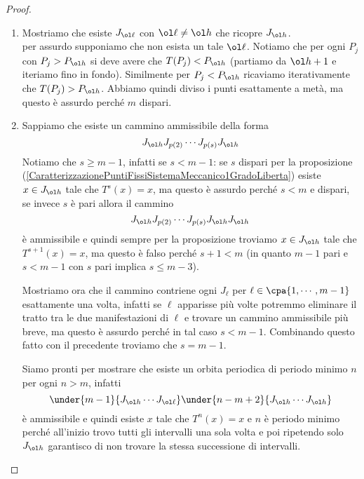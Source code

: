 \begin{proof}
\begin{enumerate}
Sia $\cpa{V_k}$ tale che per ogni $v\in V_{k+1}$ esiste $w\in V_k$ tale che $w\to v$ sta nel $T$-grafo e $V_1=\cpa{\ol h}$.\\
Notiamo che $V_k\subseteq V_{k+1}$ per ogni $k\geq 1$, quindi esiste $\ol k$ tale che $V_{\ol k}=V_{\ol k+1}=V_r$ per ogni $r\geq \ol k+1$. Questa sabilizzazione pu\`o avvenire in due modi: $V_{\ol k}=\cpa{1,\cdots,m-1}$ e abbiamo completato il passo, oppure troviamo un sottoinsieme stretto di $\cpa{1,\cdots, m-1}$, ma questo implica che partendo da $\ol h$ esiste un intervallo che non viene ricoperto (per esempio $J_a$). Sappiamo che gli estremi di $J_a$ per\`o devono essere raggiunti perch\'e sono punti dell'orbita e trattando i vari casi**** questo restituisce un'orbita in $\Oc(P_1)$ di periodo minimo pi\`u piccolo di $m$, assurdo.
\item Mostriamo che esiste $J_{\ol \ell}$ con $\ol \ell\neq \ol h$ che ricopre $J_{\ol h}$.\\
per assurdo supponiamo che non esista un tale $\ol\ell$. Notiamo che per ogni $P_j$ con $P_j>P_{\ol h}$ si deve avere che $T(P_j)<P_{\ol h}$ (partiamo da $\ol h+1$ e iteriamo fino in fondo). Similmente per $P_j<P_{\ol h}$ ricaviamo iterativamente che $T(P_j)>P_{\ol h}$. Abbiamo quindi diviso i punti esattamente a met\`a, ma questo \`e assurdo perch\'e $m$ dispari.
\item Sappiamo che esiste un cammino ammissibile della forma
\[J_{\ol h}J_{p(2)}\cdots J_{p(s)}J_{\ol h}\]
Notiamo che $s\geq m-1$, infatti se $s<m-1$: se $s$ dispari per la proposizione (\ref{CaratterizzazionePuntiFissiSistemaMeccanico1GradoLiberta}) esiste $x\in J_{\ol h}$ tale che $T^s(x)=x$, ma questo \`e assurdo perch\'e $s<m$ e dispari, se invece $s$ \`e pari allora il cammino 
\[J_{\ol h}J_{p(2)}\cdots J_{p(s)}J_{\ol h}J_{\ol h}\]
\`e ammissibile e quindi sempre per la proposizione troviamo $x\in J_{\ol h}$ tale che $T^{s+1}(x)=x$, ma questo \`e falso perch\'e $s+1<m$ (in quanto $m-1$ pari e $s<m-1$ con $s$ pari implica $s\leq m-3$).


Mostriamo ora che il cammino contriene ogni $J_{\ell}$ per $\ell\in\cpa{1,\cdots, m-1}$ esattamente una volta, infatti se $\ell$ apparisse pi\`u volte potremmo eliminare il tratto tra le due manifestazioni di $\ell$ e trovare un cammino ammissibile pi\`u breve, ma questo \`e assurdo perch\'e in tal caso $s<m-1$. Combinando questo fatto con il precedente troviamo che $s=m-1$.

Siamo pronti per mostrare che esiste un orbita periodica di periodo minimo $n$ per ogni $n>m$, infatti
\[\under{m-1}{J_{\ol h}\cdots J_{\ol \ell}}\under{n-m+2}{J_{\ol h}\cdots J_{\ol h}}\]
\`e ammissibile e quindi esiste $x$ tale che $T^{n}(x)=x$ e $n$ \`e periodo minimo perch\'e all'inizio trovo tutti gli intervalli una sola volta e poi ripetendo solo $J_{\ol h}$ garantisco di non trovare la stessa successione di intervalli.


\end{enumerate}
\end{proof}
